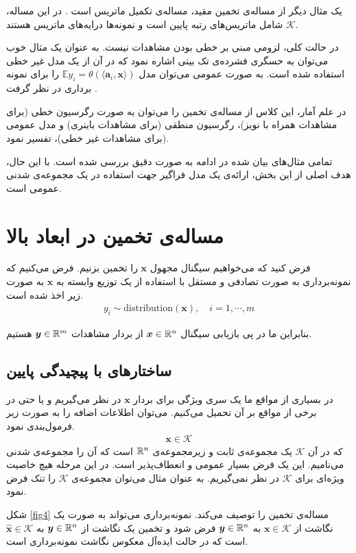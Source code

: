 یک مثال دیگر از مساله‌ی تخمین مقید، مساله‌ی تکمیل ماتریس است
\cite{recht2010guaranteed,candes2010power}.
در این مساله، 
$\mathcal{K}$
شامل ماتریس‌های رتبه پایین است و نمونه‌ها درایه‌های ماتریس هستند.

در حالت کلی، لزومی مبنی بر خطی بودن مشاهدات نیست. به عنوان یک مثال خوب می‌توان به حسگری فشرده‌ی تک بیتی اشاره نمود که در آن از یک مدل غیر خطی استفاده شده است. به صورت عمومی می‌توان مدل 
$\mathbb{E} y_{i} = \theta (\langle\bm{a}_{i}, \bm{x}\rangle)$
را برای نمونه برداری در نظر گرفت
\cite{ai2014one,plan2013robust}.

در علم آمار، این کلاس از مساله‌ی تخمین را می‌توان به صورت رگرسیون خطی (برای مشاهدات همراه با نویز)، رگرسیون منطقی (برای مشاهدات باینری) و مدل عمومی (برای مشاهدات غیر خطی)،  تفسیر نمود.

تمامی مثال‌های بیان شده در ادامه به صورت دقیق بررسی شده است. با این حال، هدف اصلی از این بخش، ارائه‌ی یک مدل فراگیر جهت استفاده در یک مجموعه‌‌ی شدنی عمومی است.

\section{مساله‌ی تخمین در ابعاد بالا}
فرض کنید که می‌خواهیم سیگنال مجهول 
$\bm{x}$
را تخمین بزنیم. فرض می‌کنیم که نمونه‌برداری به صورت تصادفی و مستقل  با استفاده از یک توزیع وابسته به 
$\bm{x}$
به صورت زیر اخذ شده است.
\begin{align}
\label{eq:eq12}
y_{i} \sim \text{distribution} (\bm{x}), \quad i= 1,\cdots,m 
\end{align}

بنابراین ما در پی بازیابی سیگنال 
$\bm{x}\in \mathbb{R}^{n}$
از بردار مشاهدات 
$\bm{y}\in \mathbb{R}^{m}$
هستیم. 
\subsection{ساختار‌های با پیچیدگی پایین}
در بسیاری از مواقع ما یک سری ویژگی برای بردار 
$\bm{x}$
در نظر می‌گیریم و یا حتی در برخی از مواقع بر آن تحمیل می‌کنیم.  می‌توان اطلاعات اضافه را به صورت زیر فرمول‌بندی نمود.
\begin{align*}
\bm{x} \in \mathcal{K}
\end{align*}
که در آن 
$\mathcal{K}$
یک مجموعه‌ی ثابت و زیرمجموعه‌ی 
$\mathbb{R}^{n}$
است که آن را مجموعه‌ی شدنی می‌نامیم. این  یک فرض بسیار عمومی و انعطاف‌پذیر است. در این مرحله هیچ خاصیت ویژه‌ای برای 
$\mathcal{K}$
در نظر نمی‌گیریم. به عنوان مثال می‌توان مجموعه‌ی 
$\mathcal{K}$
را تنک فرض نمود. 

شکل 
\ref{fig4}
\cite{Plan2016}
مساله‌ی تخمین را توصیف می‌کند. نمونه‌برداری می‌تواند به صورت یک نگاشت از 
$\bm{x} \in \mathcal{K}$
به 
$\bm{y} \in \mathbb{R}^{n}$
فرض شود و تخمین یک نگاشت از 
$\bm{y} \in \mathbb{R}^{n}$
به 
$\hat{\bm{x}} \in \mathcal{K}$
است که در حالت ایده‌آل معکوس نگاشت نمونه‌برداری است.

